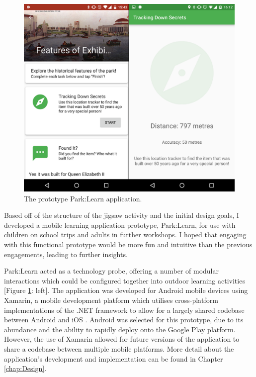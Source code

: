 \begin{figure}
  \centering
  \includegraphics[width=0.8\columnwidth]{images/chapter04/parklearnprototype.png}
  \caption{The prototype Park:Learn application.}
  \label{fig:parklearnPrototype}
\end{figure}

Based off of the structure of the jigsaw activity and the initial design goals, I developed a mobile learning application prototype, Park:Learn, for use with children on school trips and adults in further workshops. I hoped that engaging with this functional prototype would be more fun and intuitive than the previous engagements, leading to further insights.

Park:Learn acted as a technology probe, offering a number of modular interactions which could be configured together into outdoor learning activities [Figure \ref{fig:parklearnPrototype}: left]. The application was developed for Android mobile devices using Xamarin, a mobile development platform which utilises cross-platform implementations of the .NET framework to allow for a largely shared codebase between Android and iOS \citep{Xamarin2016}. Android was selected for this prototype, due to its abundance and the ability to rapidly deploy onto the Google Play platform. However, the use of Xamarin allowed for future versions of the application to share a codebase between multiple mobile platforms. More detail about the application's development and implementation can be found in Chapter \ref{chap:Design}.

